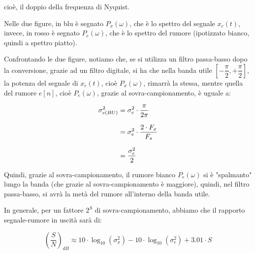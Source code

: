 cioè, il doppio della frequenza di Nyquist. \newline 

Nelle due figure, in blu è segnato $P_{x} \left(\omega\right)$, che è lo spettro del segnale $x_{c} \left(t\right)$, 
invece, in rosso è segnato $P_{e} \left(\omega\right)$, che è lo spettro del rumore (ipotizzato bianco, quindi a spettro piatto). \newline 

Confrontando le due figure, notiamo che, se si utilizza un filtro passa-basso dopo la conversione, grazie ad un filtro digitale, si ha che nella banda utile $\left[ - \dfrac{\pi}{2}, + \dfrac{\pi}{2}\right]$, 
la potenza del segnale di $x_{c} \left(t\right)$, cioè $P_{x} \left(\omega\right)$, rimarrà la stessa, 
mentre quella del rumore $e \left[ n\right]$, cioè $P_{e} \left(\omega\right)$, grazie al sovra-campionamento, è uguale a: 

{
    \Large 
    \begin{equation}
        \setlength{\jot}{10pt} %
        \begin{split}
            \sigma_{e \left(BU\right)}^{2}
            &= 
            \sigma_{e}^{2}
            \cdot 
            \dfrac{\pi}{2 \pi}
            \\
            &= 
            \sigma_{e}^{2}
            \cdot 
            \dfrac{2 \cdot F_{x}}{F_{s}}
            \\
            &= 
            \dfrac{\sigma_{e}^{2}}{2}
        \end{split}
    \end{equation}
}

Quindi, grazie al sovra-campionamento, il rumore bianco $P_{e} \left(\omega\right)$ si è "spalmanto" lungo la banda (che grazie al sovra-campionamento è maggiore), 
quindi, nel filtro passa-basso, si avrà la metà del rumore all'interno della banda utile. \newline 

In generale, per un fattore $2^{S}$ di sovra-campionamento, abbiamo che il rapporto segnale-rumore in uscità sarà di: 

{
    \Large 
    \begin{equation}
        \left(\dfrac{S}{N}\right)_{dB}
        \approx 
        10 \cdot \log_{10} \left(\sigma_{x}^{2}\right)
        - 
        10 \cdot \log_{10} \left(\sigma_{e}^{2}\right)
        + 
        3.01 \cdot S
    \end{equation}
}

